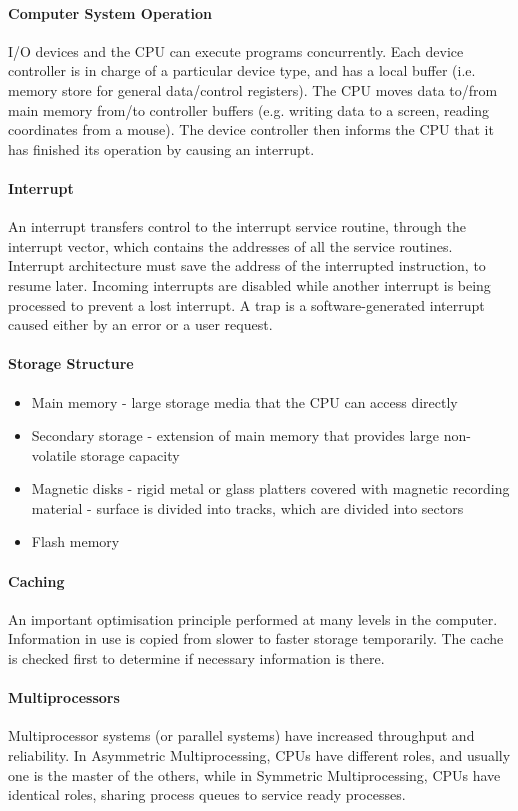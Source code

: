 \documentclass{article}
\begin{document}
\paragraph{Computer System Operation} I/O devices and the CPU can execute programs concurrently. Each device controller is in charge of a particular device type, and has a local buffer (i.e. memory store for general data/control registers). The CPU moves data to/from main memory from/to controller buffers (e.g. writing data to a screen, reading coordinates from a mouse). The device controller then informs the CPU that it has finished its operation by causing an interrupt.
\paragraph{Interrupt} An interrupt transfers control to the interrupt service routine, through the interrupt vector, which contains the addresses of all the service routines. Interrupt architecture must save the address of the interrupted instruction, to resume later. Incoming interrupts are disabled while another interrupt is being processed to prevent a lost interrupt. A trap is a software-generated interrupt caused either by an error or a user request.
\paragraph{Storage Structure}
\begin{itemize}
\item Main memory - large storage media that the CPU can access directly
\item Secondary storage - extension of main memory that provides large non-volatile storage capacity
\item Magnetic disks - rigid metal or glass platters covered with magnetic recording material - surface is divided into tracks, which are divided into sectors
\item Flash memory
\end{itemize}
\paragraph{Caching} An important optimisation principle performed at many levels in the computer. Information in use is copied from slower to faster storage temporarily. The cache is checked first to determine if necessary information is there.
\paragraph{Multiprocessors} Multiprocessor systems (or parallel systems) have increased throughput and reliability. In Asymmetric Multiprocessing, CPUs have different roles, and usually one is the master of the others, while in Symmetric Multiprocessing, CPUs have identical roles, sharing process queues to service ready processes.
\end{document}
